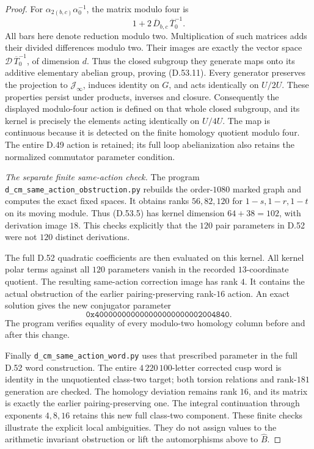 \begin{proof}
For \(\alpha_{2(b,c)}\alpha_0^{-1}\),
the matrix modulo four is
\[
                1+2\,\overline D_{b,c}\,
                                   \overline T_0^{-1}.
 \tag{D.53.21}
\]
All bars here denote reduction modulo two.
Multiplication of such matrices adds
their divided differences modulo two.
Their images are exactly the vector
space \(\mathscr D\,\overline T_0^{-1}\),
of dimension \(d\).
Thus the closed subgroup they generate
maps onto its additive elementary
abelian group, proving (D.53.11).
Every generator preserves the projection
to \(\mathcal J_\infty\), induces identity
on \(G\), and acts identically on \(U/2U\).
These properties persist under products,
inverses and closure. Consequently the
displayed modulo-four action is defined
on that whole closed subgroup, and
its kernel is precisely the elements
acting identically on \(U/4U\).
The map is continuous because it is
detected on the finite homology
quotient modulo four.
The entire D.49 action is retained;
its full loop abelianization also
retains the normalized commutator
parameter condition.

\emph{The separate finite same-action check.}
The program
\texttt{d\_cm\_same\_action\_obstruction.py}
rebuilds the order-\(1080\) marked graph
and computes the exact fixed spaces.
It obtains ranks \(56,82,120\) for
\(1-s,1-r,1-t\) on its moving module.
Thus (D.53.5) has kernel dimension
\(64+38=102\), with derivation image \(18\).
This checks explicitly that the
\(120\) pair parameters in D.52
were not \(120\) distinct derivations.

The full D.52 quadratic coefficients
are then evaluated on this kernel.
All kernel polar terms against all
\(120\) parameters vanish in the
recorded \(13\)-coordinate quotient.
The resulting same-action correction
image has rank \(4\). It contains the
actual obstruction of the earlier
pairing-preserving rank-\(16\) action.
An exact solution gives the new
conjugator parameter
\[
                  \mathtt{0x400000000000000000000002004840}.
 \tag{D.53.22}
\]
The program verifies equality of every
modulo-two homology column before and
after this change.

Finally
\texttt{d\_cm\_same\_action\_word.py}
uses that prescribed parameter in
the full D.52 word construction.
The entire \(4\,220\,100\)-letter
corrected cusp word is identity in
the unquotiented class-two target;
both torsion relations and rank-\(181\)
generation are checked.
The homology deviation remains rank
\(16\), and its matrix is exactly the
earlier pairing-preserving one.
The integral continuation through
exponents \(4,8,16\) retains this new
full class-two component.
These finite checks illustrate the
explicit local ambiguities. They do
not assign values to the arithmetic
invariant obstruction or lift the
automorphisms above to \(\widehat B\).
\end{proof}
